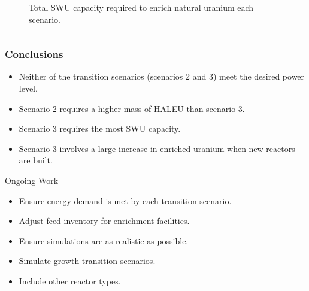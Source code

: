 \begin{frame}
\begin{columns}
\begin{figure}[h]
            \vspace*{-0.5cm}
      \caption{Total \gls{SWU} capacity required to enrich natural uranium each scenario.}
      \label{fig:swu}
  \end{figure}
  \end{columns}
\end{frame}


\begin{frame}
\frametitle{Conclusions}
    \begin{itemize}
        \item Neither of the transition scenarios (scenarios 2 and 3) meet the desired power level.
        \item Scenario 2 requires a higher mass of \gls{HALEU} than scenario 3.
        \item Scenario 3 requires the most \gls{SWU} capacity.
        \item Scenario 3 involves a large increase in enriched uranium when 
              new reactors are built.
    \end{itemize}

    \begin{block}{Ongoing Work}
        \begin{itemize}
            \item Ensure energy demand is met by each transition scenario.
            \item Adjust feed inventory for enrichment facilities.
            \item Ensure simulations are as realistic as possible.
            \item Simulate growth transition scenarios.
            \item Include other reactor types.
        \end{itemize}
    \end{block}
    

\end{frame}
